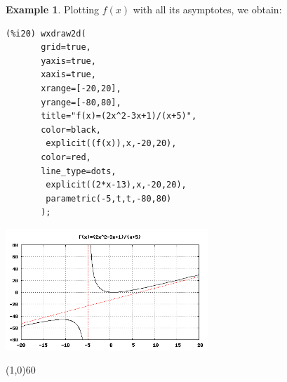 \documentclass[10.5pt,twoside]{report}
\theoremstyle{definition}
\newtheorem{exmp}{Example}[section]
\begin{document}
\begin{exmp}
Plotting $f(x)$ with all its asymptotes, we obtain:

\begin{verbatim}
(%i20) wxdraw2d(
       grid=true,
       yaxis=true,
       xaxis=true,
       xrange=[-20,20],
       yrange=[-80,80],
       title="f(x)=(2x^2-3x+1)/(x+5)",
       color=black,
        explicit((f(x)),x,-20,20),
       color=red,
       line_type=dots,
        explicit((2*x-13),x,-20,20),
        parametric(-5,t,t,-80,80)
       );
\end{verbatim}

\includegraphics[width=3in]{example_3_2_3_2}

\end{exmp}

\line(1,0){60}
\linethickness{0.5mm}
\end{document}
